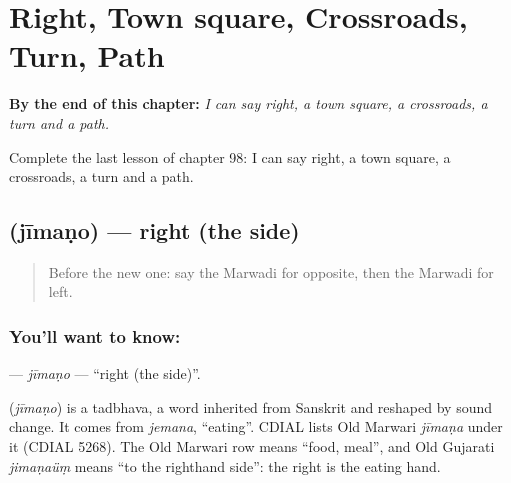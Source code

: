 
\chapter{Right, Town square, Crossroads, Turn, Path}
\label{ch:mw-right-town-square-crossroads-turn-path}

\begin{chapteropening}
\textbf{By the end of this chapter:} \emph{I can say right, a town square, a crossroads, a turn and a path.}

Complete the last lesson of chapter 98: I can say right, a town square, a crossroads, a turn and a path.
\end{chapteropening}

\section[\texorpdfstring{\mw{जीमणो} (jīmaṇo)}{जीमणो (jīmaṇo)}]{ (jīmaṇo) — right (the side)}

\label{lesson:MW-C98-jimano}



\begin{quote}
Before the new one: say the Marwadi for opposite, then the Marwadi for left.
\end{quote}

\subsection*{You'll want to know: }
\textbf{} — \emph{jīmaṇo} — \textquotedblleft{}right (the side)\textquotedblright{}.

\begin{cousinweb}
\textbf{} (\emph{jīmaṇo}) is a tadbhava, a word inherited from Sanskrit and reshaped by sound change. It comes from \emph{jemana}, \textquotedblleft{}eating\textquotedblright{}. CDIAL lists Old Marwari \emph{jīmaṇa} under it (CDIAL 5268). The Old Marwari row means \textquotedblleft{}food, meal\textquotedblright{}, and Old Gujarati \emph{jimaṇaüṃ} means \textquotedblleft{}to the righthand side\textquotedblright{}: the right is the eating hand.
\end{cousinweb}

